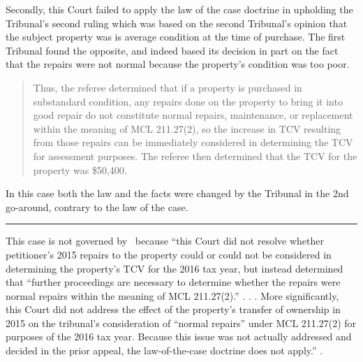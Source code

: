 \documentclass[12pt,\documentclassflag]{michiganCourtOfAppealsBrief}
\begin{document}
Secondly, this Court failed to apply the law of the case doctrine in upholding the Tribunal's second ruling which was based on the second Tribunal's opinion that the subject property was is average condition at the time of purchase. The first Tribunal found the opposite, and indeed based its decision in part on the fact that the repairs were not normal because the  property's condition was too poor.

\begin{quote}
Thus, the referee determined that if a property is purchased in substandard condition, any repairs
done on the property to bring it into good repair do not constitute normal repairs, maintenance, or
replacement within the meaning of MCL 211.27(2), so the increase in TCV resulting from those
repairs can be immediately considered in determining the TCV for assessment purposes. The
referee then determined that the TCV for the property was \$50,400.
\end{quote}

In this case both the law and the facts were changed by the Tribunal in the 2nd go-around, contrary to the law of the case.

\hrule 


This case is not governed by \cite[s]{Patru 1}\ because ``this Court did not resolve whether petitioner's 2015 repairs to the property could or could not be considered in determining the property's TCV for the 2016 tax year, but instead
determined that ``further proceedings are necessary to determine whether the repairs were normal
repairs within the meaning of MCL 211.27(2).'' . . . More significantly, this Court
did not address the effect of the property's transfer of ownership in 2015 on the tribunal's
consideration of ``normal repairs'' under MCL 211.27(2) for purposes of the 2016 tax year.
Because this issue was not actually addressed and decided in the prior appeal, the law-of-the-case
doctrine does not apply.'' .
\end{document}
